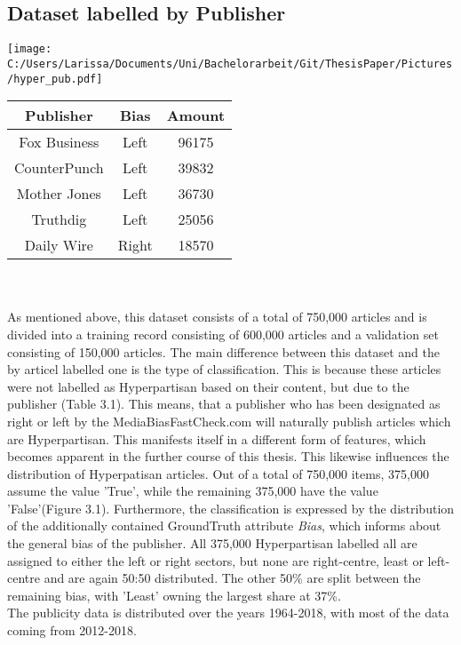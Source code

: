 \documentclass[a4paper, 11pt,titlepage,oneside,openany]{book}
\begin{document}
\subsection{Dataset labelled by Publisher}
\begin{minipage}[T]{.45\linewidth}
	\texttt{[image: C:/Users/Larissa/Documents/Uni/Bachelorarbeit/Git/ThesisPaper/Pictures/hyper\_pub.pdf]}
\end{minipage}
	\hspace{.1\linewidth}%
\begin{minipage}[T]{.45\linewidth}
	\centering
	\begin{tabular}{ccc}
		\toprule
		Publisher & Bias & Amount \\
		\midrule
		Fox Business & Left & 96175 \\
		CounterPunch & Left & 39832 \\
		Mother Jones & Left & 36730 \\
		Truthdig & Left & 25056 \\
		Daily Wire & Right & 18570 \\
		\bottomrule
	\end{tabular}
\end{minipage}\\
\\ As mentioned above, this dataset consists of a total of 750,000 articles and is divided into a training record consisting of 600,000 articles and a validation set consisting of 150,000 articles.
The main difference between this dataset and the by articel labelled one is the type of classification. This is because these articles were not labelled as Hyperpartisan based on their content, but due to the publisher (Table 3.1). This means, that a publisher who has been designated as right or left by the MediaBiasFastCheck.com will naturally publish articles which are Hyperpartisan. This manifests itself in a different form of features, which becomes apparent in the further course of this thesis. This likewise influences the distribution of Hyperpatisan articles.
 Out of a total of 750,000 items, 375,000 assume the value 'True', while the remaining 375,000 have the value 'False'(Figure 3.1). 
Furthermore, the classification is expressed by the distribution of the additionally contained GroundTruth attribute \textit{Bias}, which informs about the general bias of the publisher. All 375,000 Hyperpartisan labelled all are assigned to either the left or right sectors, but none are right-centre, least or left-centre and are again 50:50 distributed. The other 50\% are split between the remaining bias, with 'Least' owning the largest share at 37\%.\\
The publicity data is distributed over the years 1964-2018, with most of the data coming from 2012-2018.
\end{document}
